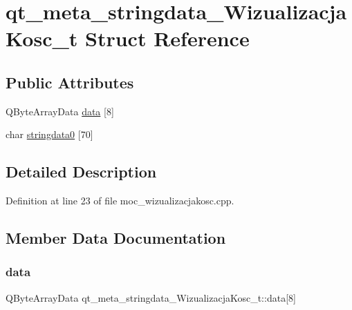 \hypertarget{structqt__meta__stringdata___wizualizacja_kosc__t}{}\section{qt\+\_\+meta\+\_\+stringdata\+\_\+\+Wizualizacja\+Kosc\+\_\+t Struct Reference}
\label{structqt__meta__stringdata___wizualizacja_kosc__t}
\subsection*{Public Attributes}
\begin{DoxyCompactItemize}
\item 
Q\+Byte\+Array\+Data \hyperlink{structqt__meta__stringdata___wizualizacja_kosc__t_af5771b62c684b454d1d7fd403efb82f2}{data} \mbox{[}8\mbox{]}
\item 
char \hyperlink{structqt__meta__stringdata___wizualizacja_kosc__t_a1fbf183fef7c610db78772640aa60b1b}{stringdata0} \mbox{[}70\mbox{]}
\end{DoxyCompactItemize}


\subsection{Detailed Description}


Definition at line 23 of file moc\+\_\+wizualizacjakosc.\+cpp.



\subsection{Member Data Documentation}
\mbox{\label{structqt__meta__stringdata___wizualizacja_kosc__t_af5771b62c684b454d1d7fd403efb82f2}} 
\subsubsection{\texorpdfstring{data}{data}}
{\footnotesize\ttfamily Q\+Byte\+Array\+Data qt\+\_\+meta\+\_\+stringdata\+\_\+\+Wizualizacja\+Kosc\+\_\+t\+::data\mbox{[}8\mbox{]}}



